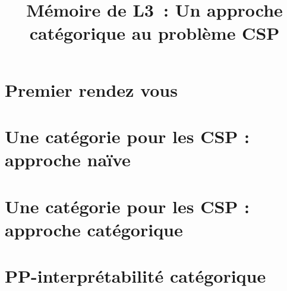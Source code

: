 \documentclass[12pt]{article}
\title{Mémoire de L3~: Un approche catégorique au problème CSP}
\author{}
\begin{document}
\maketitle


\section{Premier rendez vous}


\section{Une catégorie pour les CSP : approche naïve}


\section{Une catégorie pour les CSP : approche catégorique}


\section{PP-interprétabilité catégorique}

\end{document}
